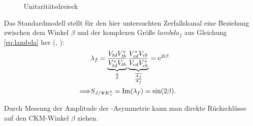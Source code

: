 \begin{figure}[hptb]
\centering
\caption{Unitaritätsdreieck}
\label{fig:unitarity}
\end{figure}

Das Standardmodell stellt für den hier untersuchten Zerfallskanal eine Beziehung zwischen dem Winkel $\beta$ und der komplexen Größe $lambda_f$ aus Gleichung \ref{eq:lambda} her (\cite{nir}, \cite{noguchi}):
\begin{align}
&\lambda_f = \underbrace{\frac{V_{td}V_{tb}^*}{V_{td}^*V_{tb}}}_{\frac{q}{p}} \underbrace{\frac{V_{cd}^*V_{cb}}{V_{cd}V_{cb}^*}}_{\frac{\overline{A_f}}{A_f}} = \mathrm{e}^{2\mathrm{i}\beta} \\
\Longrightarrow &S_{J/\Psi K_s^0} = \mathrm{Im}(\lambda_f) = \sin(2\beta).
\end{align}
 
Durch Messung der Amplitude der \CP-Asymmetrie kann man direkte Rückschlüsse auf den CKM-Winkel $\beta$ ziehen.
